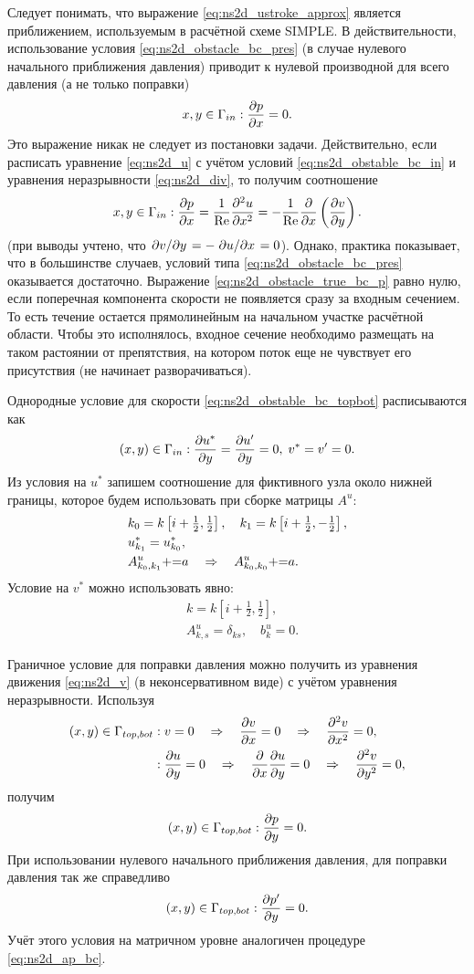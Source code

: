 Следует понимать, что выражение \cref{eq:ns2d_ustroke_approx}
является приближением, используемым в расчётной схеме SIMPLE.
В действительности, использование условия \cref{eq:ns2d_obstacle_bc_pres} (в случае нулевого начального приближения давления)
приводит к нулевой производной для всего давления (а не только поправки)
$$
x,y\in\Gamma_{in}: \frac{\partial p}{\partial x}=0.
$$
Это выражение никак не следует из постановки задачи.
Действительно, если расписать уравнение \cref{eq:ns2d_u} с учётом условий \cref{eq:ns2d_obstable_bc_in}
и уравнения неразрывности \cref{eq:ns2d_div}, то получим соотношение
\begin{equation}
\label{eq:ns2d_obstacle_true_bc_p}
x,y\in\Gamma_{in}: \frac{\partial p}{\partial x} = \frac{1}{\mathrm{Re}}\frac{\partial^2 u}{\partial x^2} = -\frac1{\mathrm{Re}}\frac{\partial }{\partial x}\left(\frac{\partial v}{\partial y}\right).
\end{equation}
(при выводы учтено, что $\left.\partial v\middle/\partial y\right. = -\left.\partial u\middle/\partial x\right. = 0$).
Однако, практика показывает, что в большинстве случаев, условий типа \cref{eq:ns2d_obstacle_bc_pres}
оказывается достаточно. Выражение \cref{eq:ns2d_obstacle_true_bc_p} равно нулю,
если поперечная компонента скорости не появляется сразу за входным сечением. То есть
течение остается прямолинейным на начальном участке расчётной области.
Чтобы это исполнялось, входное сечение необходимо размещать
на таком растоянии от препятствия, на котором поток еще не чувствует его присутствия (не начинает разворачиваться).

Однородные условие для скорости \cref{eq:ns2d_obstable_bc_topbot} расписываются
как
$$
(x,y) \in \Gamma_{in}: \frac{\partial u^*}{\partial y} = \frac{\partial u'}{\partial y} = 0, \; v^* = v' = 0.
$$
Из условия на $u^*$ запишем соотношение для фиктивного узла около нижней границы, которое будем использовать
при сборке матрицы $A^u$:
\begin{align*}
&k_0 = k\left[i+\tfrac12, \tfrac12\right], \quad k_1 = k\left[i+\tfrac12, -\tfrac12\right], \\
&u^*_{k_1} = u^*_{k_0}, \\
&A^u_{k_0, k_1} {{+}{=}} a \quad\Rightarrow\quad A^u_{k_0, k_0} {{+}{=}} a.
\end{align*}
Условие на $v^*$ можно использовать явно:
\begin{align*}
&k = k\left[i+\tfrac12, \tfrac12\right], \\
&A^u_{k,s} = \delta_{ks}, \quad b^u_k = 0.
\end{align*}

Граничное условие для поправки давления
можно получить из уравнения движения \cref{eq:ns2d_v} (в неконсервативном виде) с учётом уравнения неразрывности.
Используя
\begin{align*}
&(x,y) \in \Gamma_{top,bot}:
	v = 0 \hence \dfr{v}{x} = 0 \hence \dfrq{v}{x} = 0,\\
&\phantom{(x,y) \in \Gamma_{top,bot}}:
	\dfr{u}{y} = 0 \hence \dfr{}{x}\dfr{u}{y} = 0 \hence \dfrq{v}{y} = 0,\\
\end{align*}
получим
$$
(x,y) \in \Gamma_{top,bot}: \frac{\partial p}{\partial y} = 0.
$$
При использовании нулевого начального приближения давления, для поправки давления так же справедливо
$$
(x,y) \in \Gamma_{top,bot}: \frac{\partial p'}{\partial y} = 0.
$$
Учёт этого условия на матричном уровне аналогичен процедуре \cref{eq:ns2d_ap_bc}.

